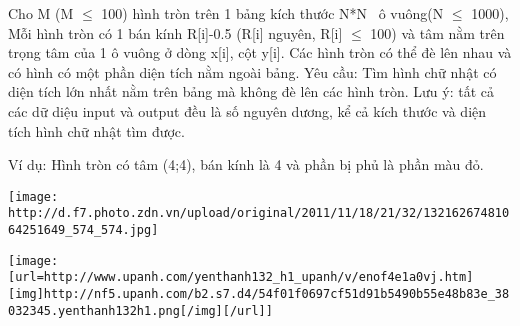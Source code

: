 Cho M (M $\le$  100) hình tròn trên 1 bảng kích thước N*N  ô vuông(N  $\le$  1000), Mỗi hình tròn có 1 bán kính R[i]-0.5 (R[i] nguyên, R[i]  $\le$  100) và tâm nằm trên  trọng tâm của 1 ô vuông ở dòng x[i], cột y[i]. Các hình tròn có thể đè lên nhau và có hình có một phần diện tích nằm ngoài bảng. Yêu cầu: Tìm hình chữ nhật có diện tích lớn nhất nằm trên bảng mà không đè lên các hình tròn. Lưu ý: tất cả các dữ diệu input và output đều là số nguyên dương, kể cả kích thước và diện tích hình chữ nhật tìm được.  

   Ví dụ: Hình tròn có tâm (4;4), bán kính là 4 và phần bị phủ là phần màu đỏ.  


\texttt{[image: http://d.f7.photo.zdn.vn/upload/original/2011/11/18/21/32/13216267481064251649\_574\_574.jpg]}


\texttt{[image: [url=http://www.upanh.com/yenthanh132\_h1\_upanh/v/enof4e1a0vj.htm][img]http://nf5.upanh.com/b2.s7.d4/54f01f0697cf51d91b5490b55e48b83e\_38032345.yenthanh132h1.png[/img][/url]]}



\
